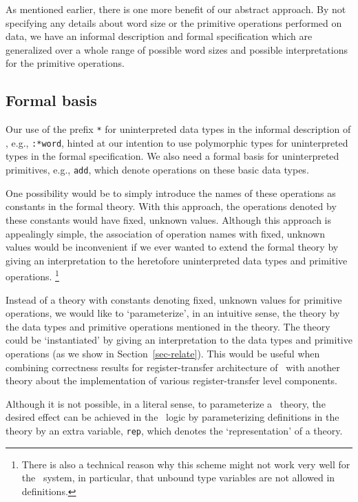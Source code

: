 As mentioned earlier,
there is one more benefit of our abstract approach.
By not specifying any details about word size or
the primitive operations performed on data,
we have an informal description and formal specification which are
generalized over a whole range of possible word sizes and possible
interpretations for the primitive operations.

\subsection{Formal basis}
\label{sec-basis}

Our use of the prefix \verb"*"
for uninterpreted data types
in the informal description of \Tamarack, e.g., \verb":*word",
hinted at our intention to use polymorphic types
for uninterpreted types in the formal specification.
We also need a formal basis for uninterpreted primitives, e.g., \verb"add",
which denote operations on these basic data types.

One possibility would be to simply introduce the names of these
operations as constants in the formal theory.
With this approach, the operations denoted by these constants
would have fixed, unknown values.
Although this approach is appealingly simple,
the association of operation names with fixed, unknown values would
be inconvenient if we ever wanted to extend the formal theory
by giving an interpretation to the
heretofore uninterpreted data types and primitive operations.
\footnote{
There is also a technical reason why this scheme might not work
very well for the \HOL\ system, in particular,
that unbound type variables are not allowed in definitions.}

Instead of a theory with constants denoting fixed, unknown values
for primitive operations, we would like to `parameterize', in an
intuitive sense, the theory by the data types and primitive operations
mentioned in the theory.
The theory could be `instantiated' by
giving an interpretation to the data types and primitive operations
(as we show in Section~\ref{sec-relate}).
This would be useful when combining correctness results for
register-transfer architecture of \Tamarack\ with another theory
about the implementation of various register-transfer level components.

Although it is not possible, in a literal sense,
to parameterize a \HOL\ theory,
the desired effect can be achieved in the \HOL\ logic by parameterizing
definitions in the theory by an extra variable, \verb"rep", which
denotes the `representation' of a theory.

